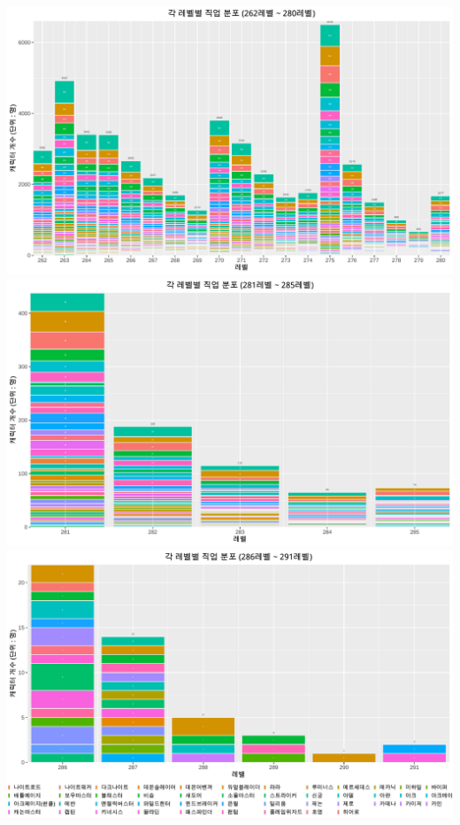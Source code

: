 \documentclass[
]{article}
\begin{document}
\includegraphics{123_files/figure-latex/ranking_all_level_job-1.pdf}
\includegraphics{123_files/figure-latex/ranking_all_level_job-2.pdf}
\includegraphics{123_files/figure-latex/ranking_all_level_job-3.pdf}
\end{document}
